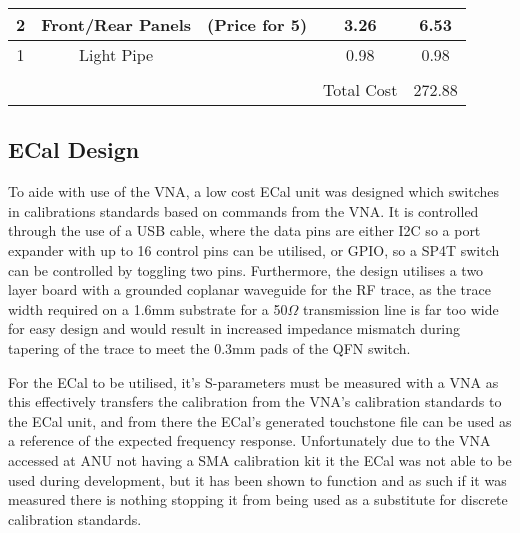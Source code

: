 \begin{table}[h!]
\begin{tabular}{|c|c|c|c|c|}
		2                 & Front/Rear Panels         & (Price for 5)            & 3.26                                                                  & 6.53                                                                      \\ \hline
		1                 & Light Pipe                 &                          & 0.98                                                                   & 0.98                                                                       \\ \hline
		&                            &                          &                                                                        &                                                                            \\ \hline
		&                            &                          & Total Cost                                                             & 272.88                                                                    \\ \hline
	\end{tabular}
\end{table} 

\newpage
\subsection{ECal Design}
To aide with use of the VNA, a low cost ECal unit was designed which switches in calibrations standards based on commands from the VNA. It is controlled through the use of a USB cable, where the data pins are either I2C so a port expander with up to 16 control pins can be utilised, or GPIO, so a SP4T switch can be controlled by toggling two pins. Furthermore, the design utilises a two layer board with a grounded coplanar waveguide for the RF trace, as the trace width required on a 1.6mm substrate for a 50$\Omega$ transmission line is far too wide for easy design and would result in increased impedance mismatch during tapering of the trace to meet the 0.3mm pads of the QFN switch. 

For the ECal to be utilised, it's S-parameters must be measured with a VNA as this effectively transfers the calibration from the VNA's calibration standards to the ECal unit, and from there the ECal's generated touchstone file can be used as a reference of the expected frequency response. Unfortunately due to the VNA accessed at ANU not having a SMA calibration kit it the ECal was not able to be used during development, but it has been shown to function and as such if it was measured there is nothing stopping it from being used as a substitute for discrete calibration standards.

